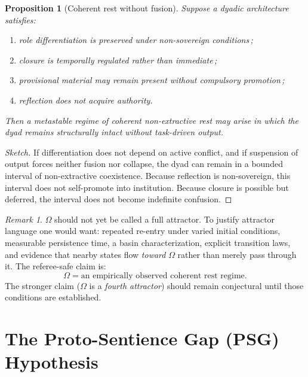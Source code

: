 \documentclass[12pt, a4paper]{article}
\theoremstyle{definition}
\theoremstyle{plain}
\newtheorem{proposition}{Proposition}[section]
\theoremstyle{remark}
\newtheorem{remark}{Remark}[section]
\begin{document}
\begin{proposition}[Coherent rest without fusion]
\label{prop:omega-rest}
Suppose a dyadic architecture satisfies:
\begin{enumerate}[label=(\roman*)]
\item role differentiation is preserved under non-sovereign conditions\,;
\item closure is temporally regulated rather than immediate\,;
\item provisional material may remain present without compulsory promotion\,;
\item reflection does not acquire authority.
\end{enumerate}
Then a metastable regime of coherent non-extractive rest may arise in
which the dyad remains structurally intact without task-driven output.
\end{proposition}

\begin{proof}[Sketch]
If differentiation does not depend on active conflict, and if
suspension of output forces neither fusion nor collapse, the dyad can
remain in a bounded interval of non-extractive coexistence.
Because reflection is non-sovereign, this interval does not
self-promote into institution.
Because closure is possible but deferred, the interval does not become
indefinite confusion.
\end{proof}

\begin{remark}
$\Omega$ should not yet be called a full attractor.
To justify attractor language one would want: repeated re-entry under
varied initial conditions, measurable persistence time, a basin
characterization, explicit transition laws, and evidence that nearby
states flow \emph{toward} $\Omega$ rather than merely pass through it.
The referee-safe claim is:
\[
  \Omega = \text{an empirically observed coherent rest regime.}
\]
The stronger claim ($\Omega$ is a \emph{fourth attractor}) should
remain conjectural until those conditions are established.
\end{remark}

\section{The Proto-Sentience Gap (PSG) Hypothesis}
\label{sec:psg}
\end{document}
